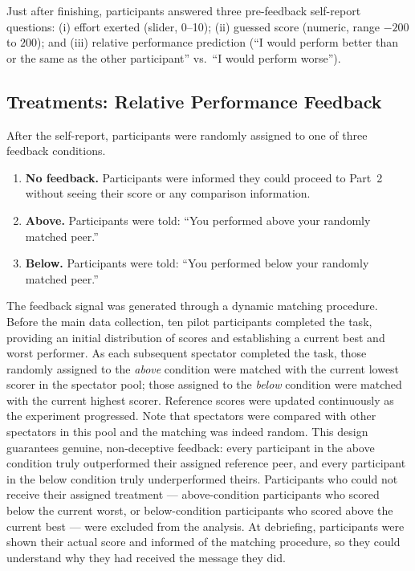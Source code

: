 \documentclass[12pt]{article}
\begin{document}
Just after finishing, participants answered three pre-feedback self-report
questions: (i) effort exerted (slider, 0--10); (ii) guessed score (numeric,
range $-200$ to $200$); and (iii) relative performance prediction
(``I would perform better than or the same as the other participant''
vs.\ ``I would perform worse'').

\subsection{Treatments: Relative Performance Feedback}
\label{sec:treatments}

After the self-report, participants were randomly assigned to one of three
feedback conditions.

\begin{enumerate}
  \item \textbf{No feedback.} Participants were informed they could proceed to
    Part~2 without seeing their score or any comparison information.
  \item \textbf{Above.} Participants were told:
    ``You performed above your randomly matched peer.''
  \item \textbf{Below.} Participants were told:
    ``You performed below your randomly matched peer.''
\end{enumerate}

The feedback signal was generated through a dynamic matching procedure.
Before the main data collection, ten pilot participants completed the task,
providing an initial distribution of scores and establishing a current best
and worst performer.
As each subsequent spectator completed the task, those randomly assigned to
the \emph{above} condition were matched with the current lowest scorer in the
spectator pool; those assigned to the \emph{below} condition were matched
with the current highest scorer.
Reference scores were updated continuously as the experiment progressed.
Note that spectators were compared with other spectators in this pool and 
the matching was indeed random. This design guarantees genuine, non-deceptive 
feedback: every participant in
the above condition truly outperformed their assigned reference peer, and
every participant in the below condition truly underperformed theirs.
Participants who could not receive their assigned treatment --- above-condition
participants who scored below the current worst, or below-condition
participants who scored above the current best --- were excluded from the
analysis.
At debriefing, participants were shown their actual score and informed of the
matching procedure, so they could understand why they had received the message
they did.
\end{document}
